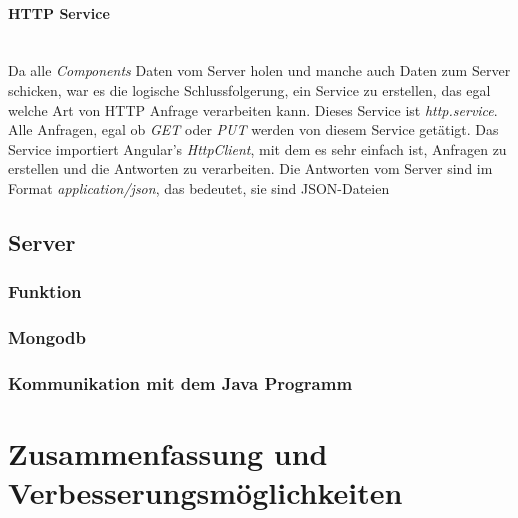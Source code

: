 \paragraph*{\ac{HTTP} Service}\mbox{}\\
Da alle \textit{Components} Daten vom Server holen und manche auch Daten zum Server schicken, war es die logische Schlussfolgerung, ein Service zu erstellen, das egal welche Art von \ac{HTTP} Anfrage verarbeiten kann. Dieses Service ist \textit{http.service}. Alle Anfragen, egal ob \textit{GET} oder \textit{PUT} werden von diesem Service getätigt. Das Service importiert Angular's \textit{HttpClient}, mit dem es sehr einfach ist, Anfragen zu erstellen und die Antworten zu verarbeiten. Die Antworten vom Server sind im Format \textit{application/json}, das bedeutet, sie sind \ac{JSON}-Dateien

\subsection{Server}
\label{sec:ums-server}

\subsubsection{Funktion}
\label{sec:ums-server-funktion}

\subsubsection{Mongodb}
\label{sec:ums-server-mongo}

\subsubsection{Kommunikation mit dem Java Programm}
\label{sec:ums-server-java}

\section{Zusammenfassung und Verbesserungsmöglichkeiten}
\label{sec:zusammenfassung}